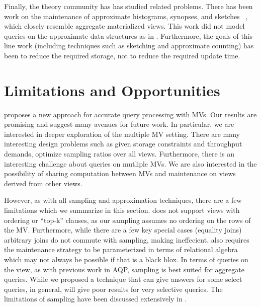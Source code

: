 Finally, the theory community has has studied related problems.
There has been work on the maintenance of approximate histograms, synopses, and sketches ~\cite{gibbons1997fast, DBLP:journals/ftdb/CormodeGHJ12}, which closely resemble aggregate materialized views.
This work did not model queries on the approximate data structures as in \svc.
Furthermore, the goals of this line work (including techniques such as sketching and approximate counting) has been to reduce the required storage, not to reduce the required update time.
\vspace{-1em}
\section{Limitations and Opportunities}\vspace{-.3em}
\svc proposes a new approach for accurate query processing with MVs.
Our results are promising and suggest many avenues for future work.
In particular, we are interested in deeper exploration of the multiple MV setting.
There are many interesting design problems such as given storage constraints and throughput demands, optimize sampling ratios over all views.
Furthermore, there is an interesting challenge about queries on mutliple MVs.
We are also interested in the possibility of sharing computation between MVs and maintenance on views derived from other views.

However, as with all sampling and approximation techniques, there are a few limitations which we summarize in this section.
\svc does not support views with ordering or ``top-k'' clauses, as our sampling assumes no ordering on the rows of the MV.
Furthermore, while there are a few key special cases (equality joins) arbitrary joins do not commute with sampling, making \svc ineffecient.
\svc also requires the maintenance strategy to be parameterized in terms of relational algebra which may not always be possible if that is a black blox.
In terms of queries on the view, as with previous work in AQP, sampling is best suited for aggregate queries.
While we proposed a technique that can give answers for some select queries, in general, \svc will give poor results for very selective queries.
The limitations of sampling have been discussed extensively in \cite{DBLP:journals/ftdb/CormodeGHJ12}.

